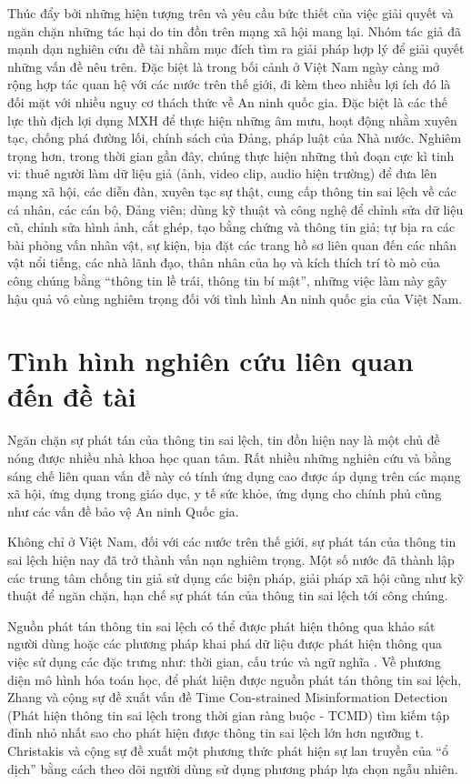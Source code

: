 Thúc đẩy bởi những hiện tượng trên và yêu cầu bức thiết của việc giải quyết và ngăn chặn những tác hại do tin đồn trên mạng xã hội mang lại. Nhóm tác giả đã mạnh dạn nghiên cứu đề tài nhằm mục đích tìm ra giải pháp hợp lý để giải quyết những vấn đề nêu trên. Đặc biệt là trong bối cảnh ở Việt Nam ngày càng mở rộng hợp tác quan hệ với các nước trên thế giới, đi kèm theo nhiều lợi ích đó là đối mặt với nhiều nguy cơ thách thức về An ninh quốc gia. Đặc biệt là các thế lực thù địch lợi dụng MXH để thực hiện những âm mưu, hoạt động nhằm xuyên tạc, chống phá đường lối, chính sách của Đảng, pháp luật của Nhà nước. Nghiêm trọng hơn, trong thời gian gần đây, chúng thực hiện những thủ đoạn cực kì tinh vi: thuê người làm dữ liệu giả (ảnh, video clip, audio hiện trường) để đưa lên mạng xã hội, các diễn đàn, xuyên tạc sự thật, cung cấp thông tin sai lệch về các cá nhân, các cán bộ, Đảng viên; dùng kỹ thuật và công nghệ để chỉnh sửa dữ liệu cũ, chỉnh sửa hình ảnh, cắt ghép, tạo bằng chứng và thông tin giả; tự bịa ra các bài phỏng vấn nhân vật, sự kiện, bịa đặt các trang hồ sơ liên quan đến các nhân vật nổi tiếng, các nhà lãnh đạo, thân nhân của họ và kích thích trí tò mò của công chúng bằng “thông tin lề trái, thông tin bí mật”, những việc làm này gây hậu quả vô cùng nghiêm trọng đối với tình hình An ninh quốc gia của Việt Nam.

\tocless\section{Tình hình nghiên cứu liên quan đến đề tài}
Ngăn chặn sự phát tán của thông tin sai lệch, tin đồn hiện nay là một chủ đề nóng được nhiều nhà khoa học quan tâm. Rất nhiều những nghiên cứu và bằng sáng chế liên quan vấn đề này có tính ứng dụng cao được áp dụng trên các mạng xã hội, ứng dụng trong giáo dục, y tế sức khỏe, ứng dụng cho chính phủ cũng như các vấn đề bảo vệ An ninh Quốc gia. 

Không chỉ ở Việt Nam, đối với các nước trên thế giới, sự phát tán của thông tin sai lệch hiện nay đã trở thành vấn nạn nghiêm trọng. Một số nước đã thành lập các trung tâm chống tin giả sử dụng các biện pháp, giải pháp xã hội cũng như kỹ thuật để ngăn chặn, hạn chế sự phát tán của thông tin sai lệch tới công chúng.

Nguồn phát tán thông tin sai lệch có thể được phát hiện thông qua khảo sát người dùng hoặc các phương pháp khai phá dữ liệu được phát hiện thông qua việc sử dụng các đặc trưng như: thời gian, cấu trúc và ngữ nghĩa \cite{nguyen9}. Về phương diện mô hình hóa toán học, để phát hiện được nguồn phát tán thông tin sai lệch, Zhang và cộng sự đề xuất vấn đề Time Con-strained Misinformation Detection (Phát hiện thông tin sai lệch trong thời gian ràng buộc - TCMD) tìm kiếm tập đỉnh nhỏ nhất sao cho phát hiện được thông tin sai lệch lớn hơn ngưỡng t. Christakis \cite{chris} và cộng sự đề xuất một phương thức phát hiện sự lan truyền của “ổ dịch” bằng cách theo dõi người dùng sử dụng phương pháp lựa chọn ngẫu nhiên.

